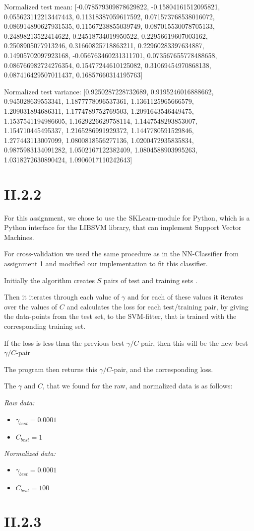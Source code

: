 \documentclass[12pt, a4paper]{article}
\begin{document}
Normalized test mean:
[-0.078579309878629822, -0.15804161512095821, 0.055623112213447443, 0.11318387059617592, 0.071573768538016072, 0.086914890627931535, 0.11567238855039749, 0.087015530078705133, 0.24898213522414622, 0.24518734019950522, 0.22956619607003162, 0.2508905077913246, 0.31660825718863211, 0.22960283397634887, 0.14905702097923168, -0.056763460231311701, 0.073567655778488658, 0.086766982724276354, 0.15477244610125082, 0.31069454970868138, 0.087416429507011437, 0.16857660314195763]

Normalized test variance:
[0.9250287228732689, 0.9195246016888662, 0.945028639553341, 1.1877778096537361, 1.1361125965666579, 1.209031894686311, 1.1774789752769503, 1.2091643546449475, 1.1537541194986605, 1.1629226629758114, 1.1447548293853007, 1.154710445495337, 1.2165286991929372, 1.1447780591529846, 1.277443113007099, 1.0800818556277136, 1.0200472935835834, 0.9875983134091282, 1.0502167122382409, 1.0804588903995263, 1.0318272630890424, 1.0906017110242643]

\section*{II.2.2}
For this assignment, we chose to use the SKLearn-module for Python, which is a Python interface for the LIBSVM library, that can implement Support Vector Machines.

For cross-validation we used the same procedure as in the NN-Classifier from assignment 1 and modified our implementation to fit this classifier.

Initially the algorithm creates $S$ pairs of test and training sets .

Then it iterates through each value of $\gamma$ and for each of these values it iterates over the values of $C$ and calculates the loss for each test/training pair, by giving the data-points from the test set, to the SVM-fitter, that is trained with the corresponding training set.

If the loss is less than the previous best $\gamma/C$-pair, then this will be the new best $\gamma/C$-pair

The program then returns this $\gamma/C$-pair, and the corresponding loss.

The $\gamma$ and $C$, that we found for the raw, and normalized data is as follows:

\textit{Raw data:}
\begin{itemize}
	\item $\gamma_{best} = 0.0001$
	\item $C_{best} = 1$
\end{itemize}

\textit{Normalized data:}
\begin{itemize}
	\item $\gamma_{best} = 0.0001$
	\item $C_{best} = 100$
\end{itemize}


\section*{II.2.3}
\end{document}
